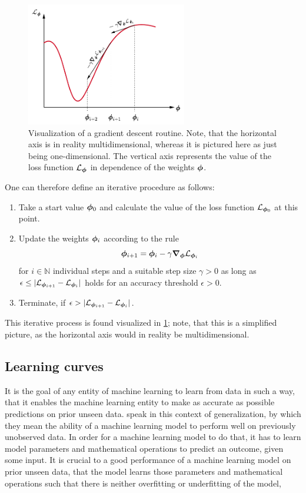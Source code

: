 \documentclass[a4paper,11pt]{report}
\def\lk#1{{\color{black}{#1}}}
\begin{document}
\begin{figure}[h]
\centering
\includegraphics[width=7cm]{figures/gradientdescent.pdf}
\caption{Visualization of a gradient descent routine. Note, that the horizontal axis is in reality multidimensional, whereas it is pictured here as just being one-dimensional. The vertical axis represents the value of the loss function $\mathcal{L}_{\bm{\phi}}$ in dependence of the weights $\bm{\phi}$.}
\label{fig:gradientdescent}
\end{figure}
One can therefore define an iterative procedure as follows:
\begin{enumerate}
\item Take a start value $\bm{\phi}_0$ and calculate the value of the loss function $\mathcal{L}_{\bm{\phi}_0}$ at this point.
\item Update the weights $\bm{\phi}_{i}$ according to the rule \begin{equation}
\bm{\phi}_{i+1} = \bm{\phi}_{i} - \gamma \bm{\nabla}_{\bm{\phi}}\mathcal{L}_{\bm{\phi}_i}
\end{equation} for $i \in \mathbb{N}$ individual steps and a suitable step size $\gamma > 0$ as long as $\epsilon \leq |\mathcal{L}_{\bm{\phi}_{i+1}}-\mathcal{L}_{\bm{\phi}_{i}}|$ holds for an accuracy threshold $\epsilon > 0$.
\item Terminate, if $\epsilon > |\mathcal{L}_{\bm{\phi}_{i+1}}-\mathcal{L}_{\bm{\phi}_{i}}|$.
\end{enumerate}
This iterative process is found visualized in \cref{fig:gradientdescent}; note, that this is a simplified picture, as the horizontal axis would in reality be multidimensional.

\subsection{Learning curves}\label{sec:learningcurves}
It is the goal of any entity of machine learning to learn from data in such a way, that it enables the machine learning entity to make as accurate as possible predictions on prior unseen data. \cite[p.110]{Goodfellow.2016} speak in this context of generalization, by which they mean the ability of a machine learning model to perform well on previously unobserved data. In order for a machine learning model to do that, it has to learn model parameters and mathematical operations to predict an outcome, given some input. It is crucial to a good performance of a machine learning model on prior unseen data, that the model learns those parameters and mathematical operations such that there is neither overfitting or underfitting of the model, \lk{nor underrepresentation present in the training and testing data.}
\end{document}
